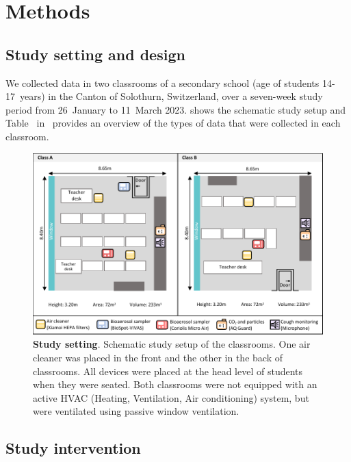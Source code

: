 \documentclass[fleqn,11pt]{wlscirep}
\begin{document}
\newpage

\section{Methods}

\subsection{Study setting and design} 

\noindent We collected data in two classrooms of a secondary school (age of students 14-17~years) in the Canton of Solothurn, Switzerland, over a seven-week study period from 26~January to 11~March 2023.  shows the schematic study setup and Table~ in \supp \, provides an overview of the types of data that were collected in each classroom.

\begin{figure}[!htpb]
    \centering
    \includegraphics{../study_setting.pdf}
    \caption{\textbf{Study setting}. Schematic study setup of the classrooms. One air cleaner was placed in the front and the other in the back of classrooms. All devices were placed at the head level of students when they were seated. Both classrooms were not equipped with an active HVAC (Heating, Ventilation, Air conditioning) system, but were ventilated using passive window ventilation. }
    \label{fig:study-setup}
\end{figure}

\subsection{Study intervention} 
\end{document}
